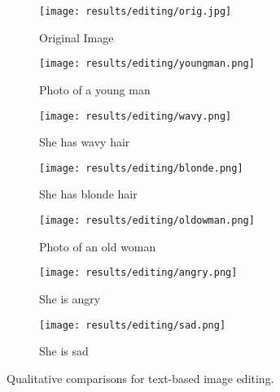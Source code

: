 
  \begin{figure*}[t!]
    \centering
    \begin{subfigure}[t]{0.135\linewidth}
      \captionsetup{justification=centering, labelformat=empty, font=scriptsize}
      \texttt{[image: results/editing/orig.jpg]}
      \caption{Original Image}
    \end{subfigure}
    \begin{subfigure}[t]{0.135\linewidth}
      \captionsetup{justification=centering, labelformat=empty, font=scriptsize}
      \texttt{[image: results/editing/youngman.png]}
      \caption{Photo of a young man}
    \end{subfigure}
        \begin{subfigure}[t]{0.135\linewidth}
      \captionsetup{justification=centering, labelformat=empty, font=scriptsize}
      \texttt{[image: results/editing/wavy.png]}
      \caption{She has wavy hair}
    \end{subfigure}
       \begin{subfigure}[t]{0.135\linewidth}
      \captionsetup{justification=centering, labelformat=empty, font=scriptsize}
      \texttt{[image: results/editing/blonde.png]}
      \caption{She has blonde hair}
    \end{subfigure}
       \begin{subfigure}[t]{0.135\linewidth}
      \captionsetup{justification=centering, labelformat=empty, font=scriptsize}
      \texttt{[image: results/editing/oldowman.png]}
      \caption{Photo of an old woman}
    \end{subfigure}
        \begin{subfigure}[t]{0.135\linewidth}
      \captionsetup{justification=centering, labelformat=empty, font=scriptsize}
      \texttt{[image: results/editing/angry.png]}
      \caption{She is angry}
    \end{subfigure}
        \begin{subfigure}[t]{0.135\linewidth}
      \captionsetup{justification=centering, labelformat=empty, font=scriptsize}
      \texttt{[image: results/editing/sad.png]}
      \caption{She is sad}
    \end{subfigure}   
    \caption{Qualitative comparisons for text-based image editing.}
    \label{fig:faceedit}
    \vspace{-2mm}
  \end{figure*}


